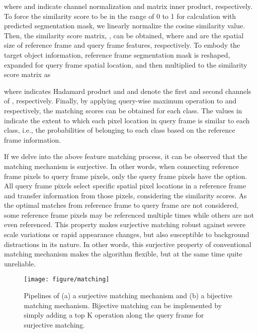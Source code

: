 \documentclass[10pt,twocolumn,letterpaper]{article}
\begin{document}
	where  and  indicate channel normalization and matrix inner product, respectively. To force the similarity score to be in the range of 0 to 1 for calculation with predicted segmentation mask, we linearly normalize the cosine similarity value. Then, the similarity score matrix, , can be obtained, where  and  are the spatial size of reference frame and query frame features, respectively. To embody the target object information, reference frame segmentation mask  is reshaped, expanded for query frame spatial location, and then multiplied to the similarity score matrix  as
	
	where  indicates Hadamard product and  and  denote the first and second channels of , respectively. Finally, by applying query-wise maximum operation to  and  respectively, the matching scores  can be obtained for each class. The values in  indicate the extent to which each pixel location in query frame is similar to each class, i.e., the probabilities of belonging to each class based on the reference frame information. 
	
	
	If we delve into the above feature matching process, it can be observed that the matching mechanism is surjective. In other words, when connecting reference frame pixels to query frame pixels, only the query frame pixels have the option. All query frame pixels select specific spatial pixel locations in a reference frame and transfer information from those pixels, considering the similarity scores. As the optimal matches from reference frame to query frame are not considered, some reference frame pixels may be referenced multiple times while others are not even referenced. This property makes surjective matching robust against severe scale variations or rapid appearance changes, but also susceptible to background distractions in its nature. In other words, this surjective property of conventional matching mechanism makes the algorithm flexible, but at the same time quite unreliable.
	
	
	\begin{figure}[t]
		\centering
		\texttt{[image: figure/matching]}
		\caption{Pipelines of (a) a surjective matching mechanism and (b) a bijective matching mechanism. Bijective matching can be implemented by simply adding a top K operation along the query frame for surjective matching.}
		\label{figure3}
	\end{figure}
	
	
	
\end{document}
